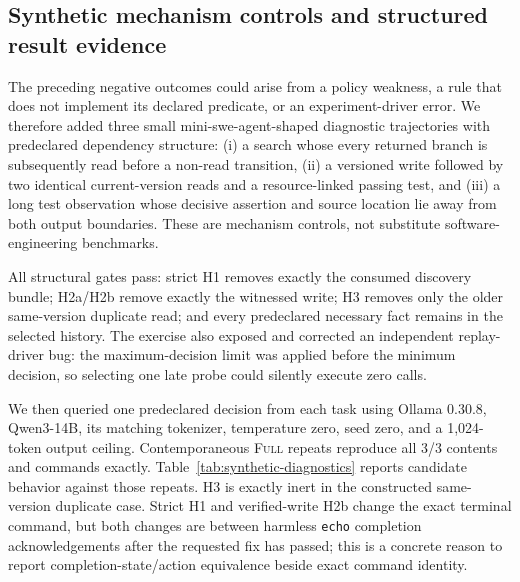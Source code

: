 \documentclass[11pt]{article}
\begin{document}
\subsection{Synthetic mechanism controls and structured result evidence}

The preceding negative outcomes could arise from a policy weakness, a rule that
does not implement its declared predicate, or an experiment-driver error. We
therefore added three small mini-swe-agent-shaped diagnostic trajectories with
predeclared dependency structure: (i) a search whose every returned branch is
subsequently read before a non-read transition, (ii) a versioned write followed
by two identical current-version reads and a resource-linked passing test, and
(iii) a long test observation whose decisive assertion and source location lie
away from both output boundaries. These are mechanism controls, not substitute
software-engineering benchmarks.

All structural gates pass: strict H1 removes exactly the consumed discovery
bundle; H2a/H2b remove exactly the witnessed write; H3 removes only the older
same-version duplicate read; and every predeclared necessary fact remains in
the selected history. The exercise also exposed and corrected an independent
replay-driver bug: the maximum-decision limit was applied before the minimum
decision, so selecting one late probe could silently execute zero calls.

We then queried one predeclared decision from each task using Ollama 0.30.8,
Qwen3-14B, its matching tokenizer, temperature zero, seed zero, and a
1,024-token output ceiling. Contemporaneous \textsc{Full} repeats reproduce all
3/3 contents and commands exactly. Table~\ref{tab:synthetic-diagnostics}
reports candidate behavior against those repeats. H3 is exactly inert in the
constructed same-version duplicate case. Strict H1 and verified-write H2b
change the exact terminal command, but both changes are between harmless
\texttt{echo} completion acknowledgements after the requested fix has passed;
this is a concrete reason to report completion-state/action equivalence beside
exact command identity.
\end{document}
